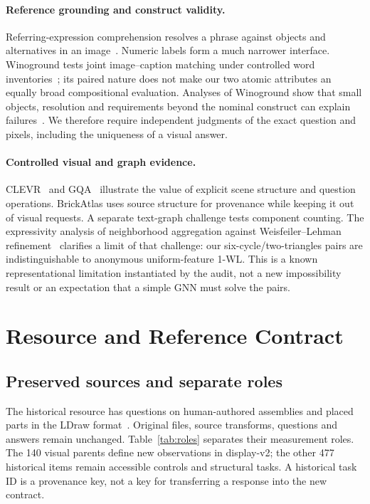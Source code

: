 \documentclass[10pt,twocolumn,letterpaper]{article}
\begin{document}
\paragraph{Reference grounding and construct validity.}
Referring-expression comprehension resolves a phrase against objects
and alternatives in an image~\cite{mao2016refexp}. Numeric labels form
a much narrower interface. Winoground tests joint image--caption
matching under controlled word inventories~\cite{thrush2022winoground};
its paired nature does not make our two atomic attributes an equally
broad compositional evaluation. Analyses of Winoground show that small
objects, resolution and requirements beyond the nominal construct
can explain failures~\cite{diwan2022winoground}. We therefore require
independent judgments of the exact question and pixels, including
the uniqueness of a visual answer.

\paragraph{Controlled visual and graph evidence.}
CLEVR~\cite{johnson2017clevr} and GQA~\cite{hudson2019gqa} illustrate
the value of explicit scene structure and question operations.
BrickAtlas uses source structure for provenance while keeping it out
of visual requests. A separate text-graph challenge tests component
counting. The expressivity analysis of neighborhood aggregation
against Weisfeiler--Lehman refinement~\cite{xu2019gnn} clarifies a
limit of that challenge: our six-cycle/two-triangles pairs are
indistinguishable to anonymous uniform-feature 1-WL. This is a
known representational limitation instantiated by the audit, not a
new impossibility result or an expectation that a simple GNN must
solve the pairs.

\section{Resource and Reference Contract}
\subsection{Preserved sources and separate roles}
The historical resource has \EvTasks{} questions on \EvSources{}
human-authored assemblies and \EvParts{} placed parts in the LDraw
format~\cite{ldraw}. Original files, source transforms, questions and
answers remain unchanged. Table~\ref{tab:roles} separates their
measurement roles. The 140 visual parents define new observations in
display-v2; the other 477 historical items remain accessible controls
and structural tasks. A historical task ID is a provenance key, not
a key for transferring a response into the new contract.
\end{document}
